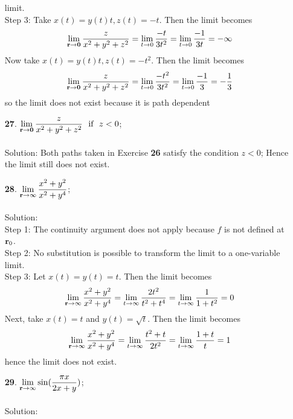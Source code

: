 \documentclass[12pt]{amsbook}
\begin{document}
\begin{enumerate}
limit.
\\
{\sf Step 3}: Take $x(t)=y(t)t,z(t)=-t$. Then the limit becomes
$$\lim_{{\bf r} \rightarrow {\bf 0}} \frac{z}{x^2+y^2+z^2}=\lim_{t \rightarrow 0} \frac{-t}{3t^2}=\lim_{t \rightarrow 0} \frac{-1}{3t}=-\infty$$
 Now take $x(t)=y(t)t,z(t)=-t^2$. Then the limit becomes
$$\lim_{{\bf r} \rightarrow {\bf 0}} \frac{z}{x^2+y^2+z^2}=\lim_{t \rightarrow 0} \frac{-t^2}{3t^2}=\lim_{t \rightarrow 0} \frac{-1}{3}=-\frac{1}{3}$$
so the limit does not exist because it is path dependent
\\
\item[{\small\bf 27}.] $\! \begin{aligned}[t]
\lim_{{\bf r} \rightarrow {\bf 0}} \frac{z}{x^2+y^2+z^2} \ \ \text{if} \ \ z<0
 \end{aligned}$;
\\
\\
{\sc Solution}: Both paths taken in Exercise {\bf 26} satisfy the condition $z<0$; Hence the limit still does not exist.
\\
\item[{\small\bf 28}.] $\! \begin{aligned}[t]
\lim_{{\bf r} \rightarrow \infty}\frac{x^2+y^2}{x^2+y^4}
\end{aligned}$;
\\
\\
{\sc Solution}:
\\
{\sf Step 1}: The continuity argument does not apply because $f$ is not defined at ${\bf r}_0$.
\\
{\sf Step 2}: No substitution is possible to transform the limit to a one-variable
limit.
\\
{\sf Step 3}: Let $x(t)=y(t)=t$. Then the limit becomes
$$\lim_{{\bf r} \rightarrow \infty}\frac{x^2+y^2}{x^2+y^4}=\lim_{t \rightarrow \infty}\frac{2t^2}{t^2+t^4}=\lim_{t \rightarrow \infty}\frac{1}{1+t^2}=0$$
Next, take $x(t)=t$ and $y(t)=\sqrt{t}$. Then the limit becomes
$$\lim_{{\bf r} \rightarrow \infty}\frac{x^2+y^2}{x^2+y^4}=\lim_{t \rightarrow \infty}\frac{t^2+t}{2t^2}=\lim_{t \rightarrow \infty}\frac{1+t}{t}=1$$
hence the limit does not exist.
\\
\item[{\small\bf 29}.] $\! \begin{aligned}[t]
\lim_{{\bf r} \rightarrow \infty}\sin(\frac{\pi x}{2x+y})
\end{aligned}$;
\\
\\
{\sc Solution}:
\\

\end{enumerate}
\end{document}
